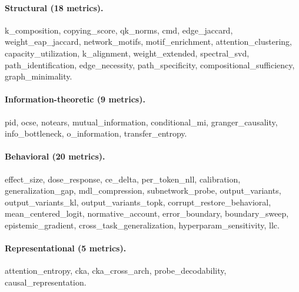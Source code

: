 \documentclass[10pt]{article}
\begin{document}
\paragraph{Structural (18 metrics).} k\_composition, copying\_score, qk\_norms, cmd, edge\_jaccard, weight\_eap\_jaccard, network\_motifs, motif\_enrichment, attention\_clustering, capacity\_utilization, k\_alignment, weight\_extended, spectral\_svd, path\_identification, edge\_necessity, path\_specificity, compositional\_sufficiency, graph\_minimality.

\paragraph{Information-theoretic (9 metrics).} pid, ocse, notears, mutual\_information, conditional\_mi, granger\_causality, info\_bottleneck, o\_information, transfer\_entropy.

\paragraph{Behavioral (20 metrics).} effect\_size, dose\_response, ce\_delta, per\_token\_nll, calibration, generalization\_gap, mdl\_compression, subnetwork\_probe, output\_variants, output\_variants\_kl, output\_variants\_topk, corrupt\_restore\_behavioral, mean\_centered\_logit, normative\_account, error\_boundary, boundary\_sweep, epistemic\_gradient, cross\_task\_generalization, hyperparam\_sensitivity, llc.

\paragraph{Representational (5 metrics).} attention\_entropy, cka, cka\_cross\_arch, probe\_decodability, causal\_representation.
\end{document}
